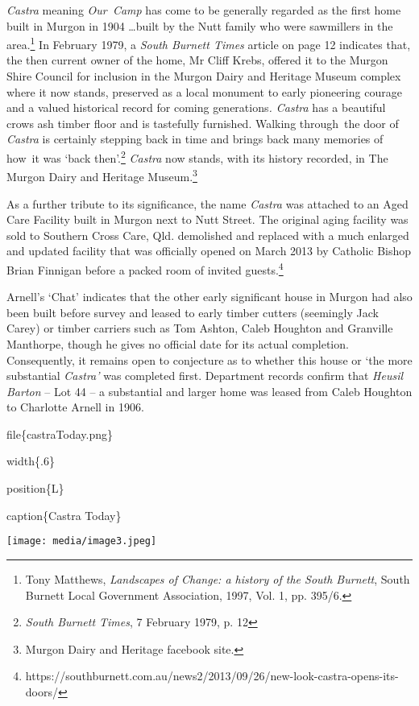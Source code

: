 \emph{Castra} meaning \emph{Our~Camp} has come to be generally regarded
as the first home built in Murgon in 1904 \ldots built by the Nutt
family who were sawmillers in the area.\footnote{Tony Matthews,
  \emph{Landscapes of Change: a history of the South Burnett}, South
  Burnett Local Government Association, 1997, Vol. 1, pp. 395/6.} In
February 1979, a \emph{South Burnett Times} article on page 12 indicates
that, the then current owner of the home, Mr Cliff Krebs, offered it to
the Murgon Shire Council for inclusion in the Murgon Dairy and Heritage
Museum complex where it now stands, preserved as a local monument to
early pioneering courage and a valued historical record for coming
generations\emph{. Castra} has a beautiful crows ash timber floor and is
tastefully furnished. Walking through~the door of \emph{Castra} is
certainly stepping back in time and brings back many memories of how~it
was `back then'.\footnote{\emph{South Burnett Times}, 7 February 1979,
  p. 12} \emph{Castra} now stands, with its history recorded, in The
Murgon Dairy and Heritage Museum.\footnote{Murgon Dairy and Heritage
  facebook site.}

As a further tribute to its significance, the name \emph{Castra} was
attached to an Aged Care Facility built in Murgon next to Nutt Street.
The original aging facility was sold to Southern Cross Care, Qld.
demolished and replaced with a much enlarged and updated facility that
was officially opened on March 2013 by Catholic Bishop Brian Finnigan
before a packed room of invited guests.\footnote{https://southburnett.com.au/news2/2013/09/26/new-look-castra-opens-its-doors/}

Arnell's `Chat' indicates that the other early significant house in
Murgon had also been built before survey and leased to early timber
cutters (seemingly Jack Carey) or timber carriers such as Tom Ashton,
Caleb Houghton and Granville Manthorpe, though he gives no official date
for its actual completion. Consequently, it remains open to conjecture
as to whether this house or `the more substantial \emph{Castra'} was
completed first. Department records confirm that \emph{Heusil Barton} --
Lot 44 -- a substantial and larger home was leased from Caleb Houghton
to Charlotte Arnell in 1906.

file\{castraToday.png\}

width\{.6\}

position\{L\}

caption\{Castra Today\}

\texttt{[image: media/image3.jpeg]}

